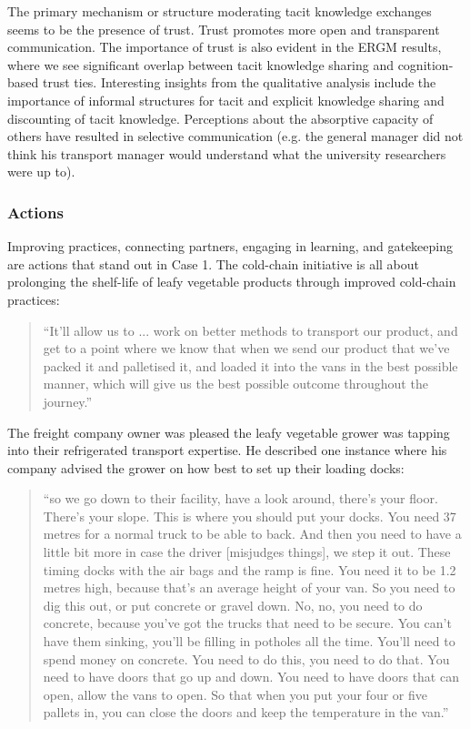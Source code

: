 The primary mechanism or structure moderating tacit knowledge exchanges seems to be the presence of trust. Trust promotes more open and transparent communication. The importance of trust is also evident in the ERGM results, where we see significant overlap between tacit knowledge sharing and cognition-based trust ties. Interesting insights from the qualitative analysis include the importance of informal structures for tacit and explicit knowledge sharing and discounting of tacit knowledge. Perceptions about the absorptive capacity of others have resulted in selective communication (e.g. the general manager did not think his transport manager would understand what the university researchers were up to).

\subsubsection{Actions}

Improving practices, connecting partners, engaging in learning, and gatekeeping are actions that stand out in Case 1. The cold-chain initiative is all about prolonging the shelf-life of leafy vegetable products through improved cold-chain practices:

\begin{quote}
\small
\enquote{It'll allow us to ... work on better methods to transport our product, and get to a point where we know that when we send our product that we've packed it and palletised it, and loaded it into the vans in the best possible manner, which will give us the best possible outcome throughout the journey.} \\
\end{quote}

The freight company owner was pleased the leafy vegetable grower was tapping into their refrigerated transport expertise. He described one instance where his company advised the grower on how best to set up their loading docks: 

\begin{quote}
\small
\enquote{so we go down to their facility, have a look around, there's your floor. There's your slope. This is where you should put your docks. You need 37 metres for a normal truck to be able to back. And then you need to have a little bit more in case the driver [misjudges things], we step it out. These timing docks with the air bags and the ramp is fine. You need it to be 1.2 metres high, because that’s an average height of your van. So you need to dig this out, or put concrete or gravel down. No, no, you need to do concrete, because you've got the trucks that need to be secure. You can't have them sinking, you'll be filling in potholes all the time. You'll need to spend money on concrete. You need to do this, you need to do that. You need to have doors that go up and down. You need to have doors that can open, allow the vans to open. So that when you put your four or five pallets in, you can close the doors and keep the temperature in the van.} \\
\end{quote}

